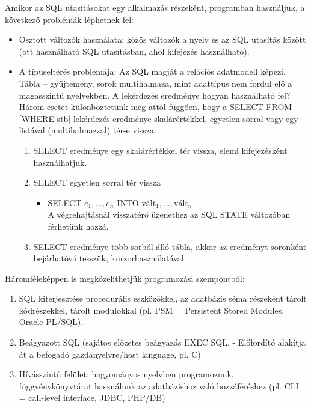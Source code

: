 \documentclass[tikz,12pt,margin=0px]{article}
\begin{document}
	Amikor az SQL utasításokat egy alkalmazás részeként, programban használjuk, a következő problémák léphetnek fel:
	\begin{itemize}
        \item Osztott változók használata: közös változók a nyelv és az SQL utasítás között (ott használható SQL utasításban, ahol kifejezés használható).
        \item A típuseltérés problémája: Az SQL magját a relációs adatmodell képezi. Tábla – gyűjtemény, sorok multihalmaza, mint adattípus nem fordul elő a magasszintű nyelvekben. A lekérdezés eredménye hogyan használható fel? \\
        Három esetet különböztetünk meg attól függően, hogy a SELECT FROM [WHERE stb] lekérdezés eredménye skalárértékkel, egyetlen sorral vagy egy listával (multihalmazzal) tér-e vissza.
        \begin{enumerate}
            \item SELECT eredménye egy skalárértékkel tér vissza, elemi kifejezésként használhatjuk.
            \item SELECT egyetlen sorral tér vissza
            \begin{itemize}
                \item SELECT $e_1, \ldots, e_n$ INTO $\text{vált}_1, \ldots, \text{vált}_n$\\
                A végrehajtásnál visszatérő üzenethez az SQL STATE változóban férhetünk hozzá.
            \end{itemize}
            \item SELECT eredménye több sorból álló tábla, akkor az eredményt soronként bejárhatóvá tesszük, kurzorhasználatával.
        \end{enumerate}
 	\end{itemize}
\newpage
 	\noindent Háromféleképpen is megközelíthetjük programozási szempontból:
 	\begin{enumerate}
 		\item SQL kiterjesztése procedurális eszközökkel, az adatbázis séma részeként tárolt kódrészekkel, tárolt modulokkal (pl. PSM = Persistent Stored Modules, Oracle PL/SQL).
 		\item Beágyazott SQL (sajátos előzetes beágyazás EXEC SQL. - Előfordító alakítja át a befogadó gazdanyelvre/host language, pl. C)
 		\item Hívásszintű felület: hagyományos nyelvben programozunk, függvénykönyvtárat használunk az adatbázishoz való hozzáféréshez (pl. CLI = call-level interface, JDBC, PHP/DB)
 	\end{enumerate}
 	
\end{document}
